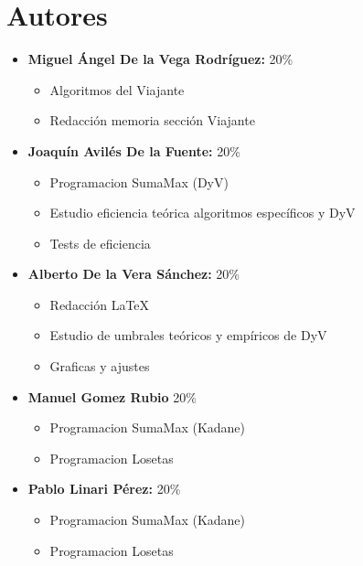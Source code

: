 \documentclass[11pt,openany]{book}
\begin{document}
\tableofcontents %
\newpage %


\chapter{Autores}
\begin{itemize}
      \item \textbf{Miguel Ángel De la Vega Rodríguez:} 20\%
            \begin{itemize}
                  \item Algoritmos del Viajante
                  \item Redacción memoria sección Viajante
            \end{itemize}
      \item \textbf{Joaquín Avilés De la Fuente:} 20\%
            \begin{itemize}
                  \item Programacion SumaMax (DyV)
                  \item Estudio eficiencia teórica algoritmos específicos y DyV
                  \item Tests de eficiencia
            \end{itemize}
      \item \textbf{Alberto De la Vera Sánchez: } 20\%
            \begin{itemize}
                  \item Redacción \LaTeX
                  \item Estudio de umbrales teóricos y empíricos de DyV
                  \item Graficas y ajustes
            \end{itemize}
      \item \textbf{Manuel Gomez Rubio} 20\%
            \begin{itemize}
                  \item Programacion SumaMax (Kadane)
                  \item Programacion Losetas
            \end{itemize}
      \item \textbf{Pablo Linari Pérez:} 20\%
            \begin{itemize}
                  \item Programacion SumaMax (Kadane)
                  \item Programacion Losetas
            \end{itemize}
\end{itemize}
\end{document}
